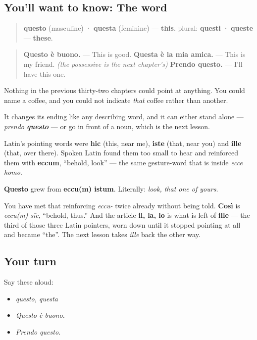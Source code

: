 \subsection*{You'll want to know: The word}
\begin{quote}
\textbf{questo} (masculine) · \textbf{questa} (feminine) — \textbf{this}. plural: \textbf{questi} · \textbf{queste} — \textbf{these}.
\end{quote}

\begin{quote}
\textbf{Questo è buono.} — This is good. \textbf{Questa è la mia amica.} — This is my friend. \emph{(the possessive is the next chapter's)} \textbf{Prendo questo.} — I'll have this one.
\end{quote}

Nothing in the previous thirty-two chapters could point at anything. You could name a coffee, and you could not indicate \emph{that} coffee rather than another.

It changes its ending like any describing word, and it can either stand alone — \emph{prendo \textbf{questo}} — or go in front of a noun, which is the next lesson.

\begin{cousinweb}
Latin's pointing words were \textbf{hic} (this, near me), \textbf{iste} (that, near you) and \textbf{ille} (that, over there). Spoken Latin found them too small to hear and reinforced them with \textbf{eccum}, \textquotedblleft{}behold, look\textquotedblright{} — the same gesture-word that is inside \emph{ecce homo}.

\textbf{Questo} grew from \textbf{eccu(m) istum}. Literally: \emph{look, that one of yours.}

You have met that reinforcing \emph{eccu-} twice already without being told. \textbf{Così} is \emph{eccu(m) sīc}, \textquotedblleft{}behold, thus.\textquotedblright{} And the article \textbf{il, la, lo} is what is left of \textbf{ille} — the third of those three Latin pointers, worn down until it stopped pointing at all and became \textquotedblleft{}the\textquotedblright{}. The next lesson takes \emph{ille} back the other way.
\end{cousinweb}

\subsection*{Your turn}
Say these aloud:

\begin{itemize}
\raggedright
  \item \emph{questo, questa}
  \item \emph{Questo è buono.}
  \item \emph{Prendo questo.}
\end{itemize}


